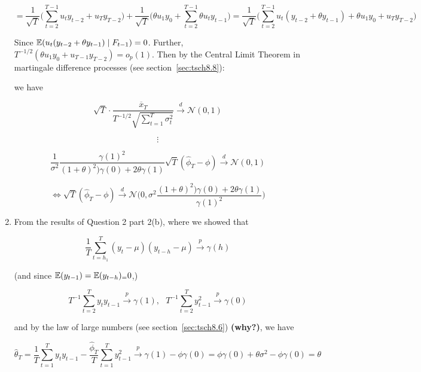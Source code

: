 \begin{enumerate}[(1)]
\[
= \frac{1}{\sqrt{T}} \bigg(\sum_{t=2}^{T-1} u_t y_{t-2} + u_T y_{T-2}\bigg)  + \frac{1}{\sqrt{T}} \bigg( \theta u_1 y_0 + \sum_{t=2}^{T-1}  \theta  u_{t} y_{t-1} \bigg)  = \frac{1}{\sqrt{T}} \bigg( \sum_{t=2}^{T-1} u_t(y_{t-2} + \theta y_{t-1}) + \theta u_1 y_0 + u_T y_{T-2} \bigg)
\] 

Since \(\mathbb{E}( u_t(y_{t-2} + \theta y_{t-1}) \mid F_{t-1} ) = 0\). Further, \(T^{-1/2} (\theta u_1 y_0 + u_{T-1}y_{T-2}) = o_p(1)\). Then by the Central Limit Theorem in martingale difference processes (see section~\ref{sec:tsch8.8}):

\noindent{}

we have

\[
\sqrt{T} \cdot \frac{\overline{x}_T }{ T^{-1/2}\sqrt{ \sum_{t=1}^T \sigma_t^2}} \xrightarrow{d} \mathcal{N}(0, 1)
\]

\[
\vdots
\]

\[
\frac{1}{ \sigma^2} \frac{\gamma(1)^2}{(1+\theta)^2) \gamma(0) + 2 \theta \gamma(1)} \sqrt{T}(\hat{\phi}_T - \phi) \xrightarrow{d} \mathcal{N} (0, 1)
\]

\[
\iff \sqrt{T}(\hat{\phi}_T - \phi) \xrightarrow{d} \mathcal{N} \bigg( 0, \sigma^2 \frac{(1+\theta)^2) \gamma(0) + 2 \theta \gamma(1)}{\gamma(1)^2} \bigg)
\]


\item From the results of Question 2 part 2(b), where we showed that 

\[
\frac{1}{T}\sum_{t=h_1}^T (y_t - \mu)(y_{t-h} - \mu) \xrightarrow{p} \gamma(h)
\]

(and since \(\mathbb{E}(y_{t-1}) = \mathbb{E}(y_{t-h} )_= 0\),)

\[
T^{-1}\sum_{t=2}^T y_{t}y_{t-1} \xrightarrow{p} \gamma(1), \ \ \ T^{-1}\sum_{t=2}^T y_{t-1}^2\xrightarrow{p} \gamma(0)
\]


and by the law of large numbers  (see section~\ref{sec:tsch8.6}) \textbf{(why?)}, we have

\[
\hat{\theta}_T = \frac{1}{T} \sum_{t=1}^T y_ty_{t-1} - \frac{\hat{\phi}_T}{T} \sum_{t=1}^T y_{t-1}^2 \xrightarrow{p} \gamma(1) - \phi \gamma(0) = \phi \gamma(0) + \theta \sigma^2 - \phi \gamma(0) =  \theta
\]

\end{enumerate}

